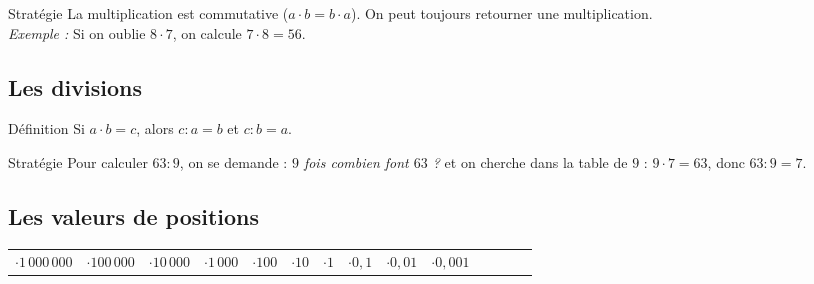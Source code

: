 \begin{astuce}{Stratégie}
La multiplication est commutative ($a \cdot b = b \cdot a$). On peut toujours retourner une multiplication.\\
\textit{Exemple :} Si on oublie $8 \cdot 7$, on calcule $7 \cdot 8 = 56$.
\end{astuce}

\vspace{10pt}
\subsection{Les divisions}
 
\begin{regle}{Définition}
Si $a \cdot b = c$, alors $c : a = b$ et $c : b = a$.
\end{regle}
 
\vspace{6pt}
 
\begin{astuce}{Stratégie}
Pour calculer $63 : 9$, on se demande : \textit{\og $9$ fois combien font $63$ ?\fg{}} et on cherche dans la table de $9$ : $9 \cdot 7 = 63$, donc $63 : 9 = 7$.
\end{astuce}

\newpage
\semaineinvisible
{} 

\vfill
\subsection{Les valeurs de positions}

{\footnotesize
\def\arraystretch{1.1}
\begin{tabularx}{\linewidth}{|*{14}{C|}}
\hline
{}&&&&&&&&&\\\hline
$\cdot 1\,000\,000$&$\cdot 100\,000$&$\cdot 10\,000$&$\cdot 1\,000$&$\cdot 100$&$\cdot 10$&$\cdot 1$&$\cdot 0,1$&$\cdot 0,01$&$\cdot 0,001$\\\hline
\end{tabularx}
\def\arraystretch{1}}

